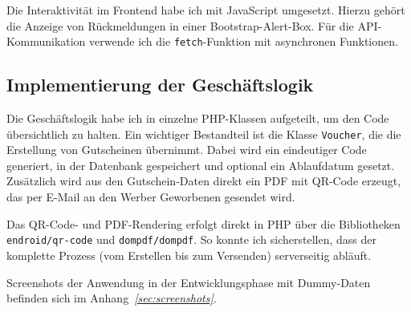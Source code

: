 

Die Interaktivität im Frontend habe ich mit JavaScript umgesetzt. 
Hierzu gehört \zB die Anzeige von Rückmeldungen in einer Bootstrap-Alert-Box.
Für die API-Kommunikation verwende ich die \texttt{fetch}-Funktion mit asynchronen Funktionen.



\cleardoublepage

\subsection{Implementierung der Geschäftslogik}
\label{sec:ImplementierungGeschaeftslogik}

Die Geschäftslogik habe ich in einzelne PHP-Klassen aufgeteilt, um den Code übersichtlich zu halten.
Ein wichtiger Bestandteil ist die Klasse \texttt{Voucher}, die die Erstellung von Gutscheinen übernimmt.
Dabei wird ein eindeutiger Code generiert, in der Datenbank gespeichert und optional ein Ablaufdatum gesetzt.
Zusätzlich wird aus den Gutschein-Daten direkt ein PDF mit QR-Code erzeugt, das per E-Mail an den Werber \bzw Geworbenen gesendet wird.



Das QR-Code- und PDF-Rendering erfolgt direkt in PHP über die Bibliotheken \texttt{endroid/qr-code} und \texttt{dompdf/dompdf}.
So konnte ich sicherstellen, dass der komplette Prozess (vom Erstellen bis zum Versenden) serverseitig abläuft.

Screenshots der Anwendung in der Entwicklungsphase mit Dummy-Daten befinden sich im Anhang~\textit{\ref{sec:screenshots}}.

